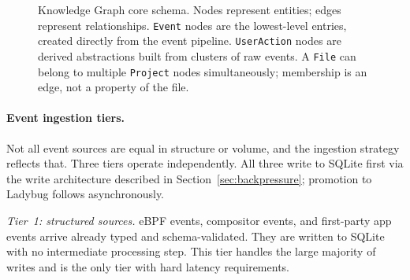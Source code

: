 \begin{figure}[htbp]
\centering
{}
\caption{Knowledge Graph core schema. Nodes represent entities; edges
represent relationships. \texttt{Event} nodes are the lowest-level entries,
created directly from the event pipeline. \texttt{UserAction} nodes are
derived abstractions built from clusters of raw events. A \texttt{File} can
belong to multiple \texttt{Project} nodes simultaneously; membership is an
edge, not a property of the file.}
\label{fig:kg-schema}
\end{figure}

\paragraph{Event ingestion tiers.}
Not all event sources are equal in structure or volume, and the ingestion
strategy reflects that. Three tiers operate independently. All three write
to SQLite first via the write architecture described in
Section~\ref{sec:backpressure}; promotion to Ladybug follows asynchronously.

\emph{Tier~1: structured sources.} eBPF events, compositor events, and
first-party app events arrive already typed and schema-validated. They are
written to SQLite with no intermediate processing step. This tier handles
the large majority of writes and is the only tier with hard latency
requirements.


